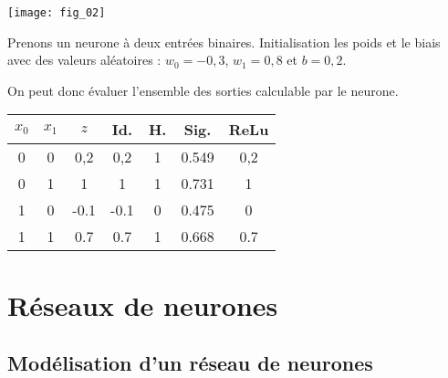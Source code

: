 \begin{marginfigure}
\texttt{[image: fig\_02]}
\end{marginfigure}

\begin{exemple}
Prenons un neurone à deux entrées binaires. 
Initialisation les poids et le biais avec des valeurs aléatoires : $w_0 = -0,3$, $w_1 = 0,8$ et $b=0,2$.

On peut donc évaluer l'ensemble des sorties calculable par le neurone.

\begin{center}
\begin{tabular}{|c|c|| c || c| c|c|c|}
\hline
$x_0$ & $x_1$ & $z$ & Id. & H. & Sig. & ReLu \\
\hline
\hline
0 & 0 & 0,2   &   0,2   &  1 & 0.549 & 0,2 \\
0 & 1 & 1     &    1     &  1 & 0.731  & 1\\
1 & 0 & -0.1  &    -0.1 &  0 &0.475 & 0 \\
1 & 1 & 0.7  &     0.7  &  1 &0.668 & 0.7\\
\hline
\end{tabular}
\end{center}

\end{exemple}


\section{Réseaux de neurones}

\subsection{Modélisation d'un réseau de neurones} 


